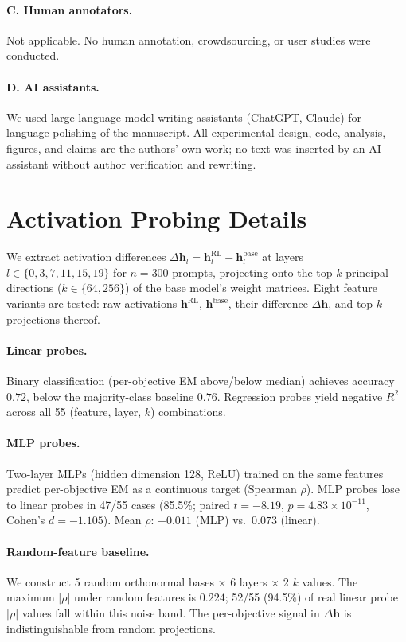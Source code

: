 \paragraph{C. Human annotators.} Not applicable. No human annotation, crowdsourcing, or user studies were conducted.

\paragraph{D. AI assistants.} We used large-language-model writing assistants (ChatGPT, Claude) for language polishing of the manuscript. All experimental design, code, analysis, figures, and claims are the authors' own work; no text was inserted by an AI assistant without author verification and rewriting.

\section{Activation Probing Details}
\label{app:probing}

We extract activation differences $\Delta\mathbf{h}_l = \mathbf{h}_l^\text{RL} - \mathbf{h}_l^\text{base}$ at layers $l \in \{0, 3, 7, 11, 15, 19\}$ for $n = 300$ prompts, projecting onto the top-$k$ principal directions ($k \in \{64, 256\}$) of the base model's weight matrices. Eight feature variants are tested: raw activations $\mathbf{h}^\text{RL}$, $\mathbf{h}^\text{base}$, their difference $\Delta\mathbf{h}$, and top-$k$ projections thereof.

\paragraph{Linear probes.} Binary classification (per-objective EM above/below median) achieves accuracy $0.72$, below the majority-class baseline $0.76$. Regression probes yield negative $R^2$ across all 55 (feature, layer, $k$) combinations.

\paragraph{MLP probes.} Two-layer MLPs (hidden dimension 128, ReLU) trained on the same features predict per-objective EM as a continuous target (Spearman $\rho$). MLP probes lose to linear probes in 47/55 cases (85.5\%; paired $t = -8.19$, $p = 4.83 \times 10^{-11}$, Cohen's $d = -1.105$). Mean $\rho$: $-0.011$ (MLP) vs.\ $0.073$ (linear).

\paragraph{Random-feature baseline.} We construct 5 random orthonormal bases $\times$ 6 layers $\times$ 2 $k$ values. The maximum $|\rho|$ under random features is $0.224$; 52/55 (94.5\%) of real linear probe $|\rho|$ values fall within this noise band. The per-objective signal in $\Delta\mathbf{h}$ is indistinguishable from random projections.


